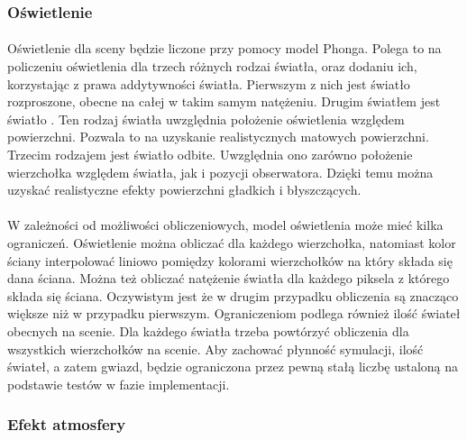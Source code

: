 \subsubsection{Oświetlenie}\label{subsub:oswietlenie}

\paragraph{}

Oświetlenie dla sceny będzie liczone przy pomocy model Phonga. Polega to na policzeniu oświetlenia dla trzech różnych rodzai światła, oraz dodaniu ich, korzystając z prawa addytywności światła. Pierwszym z nich jest światło rozproszone, obecne na całej w takim samym natężeniu. Drugim światłem jest światło . Ten rodzaj światła uwzględnia położenie oświetlenia względem powierzchni. Pozwala to na uzyskanie realistycznych matowych powierzchni. Trzecim rodzajem jest światło odbite. Uwzględnia ono zarówno położenie wierzchołka względem światła, jak i pozycji obserwatora. Dzięki temu można uzyskać realistyczne efekty powierzchni gładkich i błyszczących.

\paragraph{}

W zależności od możliwości obliczeniowych, model oświetlenia może mieć kilka ograniczeń. Oświetlenie można obliczać dla każdego wierzchołka, natomiast kolor ściany interpolować liniowo pomiędzy kolorami wierzchołków na który składa się dana ściana. Można też obliczać natężenie światła dla każdego piksela z którego składa się ściana. Oczywistym jest że w drugim przypadku obliczenia są znacząco większe niż w przypadku pierwszym. Ograniczeniom podlega również ilość świateł obecnych na scenie. Dla każdego światła trzeba powtórzyć obliczenia dla wszystkich wierzchołków na scenie. Aby zachować płynność symulacji, ilość świateł, a zatem gwiazd, będzie ograniczona przez pewną stałą liczbę ustaloną na podstawie testów w fazie implementacji.

\subsubsection{Efekt atmosfery}\label{subsub:efekt atmosfery}

\paragraph{}

